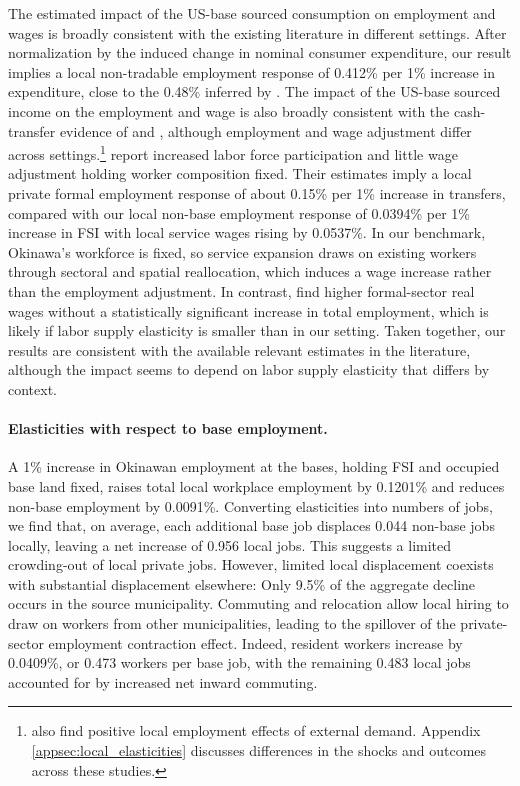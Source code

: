 \documentclass[12pt, unicode, a4paper]{article}
\newcommand{\1}{\mbox{1}\hspace{-0.25em}\mbox{l}} %
\begin{document}
The estimated impact of the US-base sourced consumption on employment and wages is broadly consistent with the existing literature in different settings.
After normalization by the induced change in nominal consumer expenditure, our result implies a local non-tradable employment response of 0.412\% per 1\% increase in expenditure, close to the 0.48\% inferred by \citet{mian2014explains}.
The impact of the US-base sourced income on the employment and wage is also broadly consistent with the cash-transfer evidence of \citet{gerard2026cash} and \citet{mendes2026macroeconomic}, although employment and wage adjustment differ across settings.\footnote{\citet{faber2019tourism} also find positive local employment effects of external demand. Appendix \ref{appsec:local_elasticities} discusses differences in the shocks and outcomes across these studies.} \citet{gerard2026cash} report increased labor force participation and little wage adjustment holding worker composition fixed. Their estimates imply a local private formal employment response of about 0.15\% per 1\% increase in transfers, compared with our local non-base employment response of 0.0394\% per 1\% increase in FSI with local service wages rising by 0.0537\%. In our benchmark, Okinawa's workforce is fixed, so service expansion draws on existing workers through sectoral and spatial reallocation, which induces a wage increase rather than the employment adjustment. In contrast, \citet{mendes2026macroeconomic} find higher formal-sector real wages without a statistically significant increase in total employment, which is likely if labor supply elasticity is smaller than in our setting. 
Taken together, our results are consistent with the available relevant estimates in the literature, although the impact seems to depend on labor supply elasticity that differs by context. 


\paragraph{Elasticities with respect to base employment.}
A 1\% increase in Okinawan employment at the bases, holding FSI and occupied base land fixed, raises total local workplace employment by 0.1201\% and reduces non-base employment by 0.0091\%. Converting elasticities into numbers of jobs, we find that, on average, each additional base job displaces 0.044 non-base jobs locally, leaving a net increase of 0.956 local jobs. 
This suggests a limited crowding-out of local private jobs.
However, limited local displacement coexists with substantial displacement elsewhere: Only 9.5\% of the aggregate decline occurs in the source municipality. Commuting and relocation allow local hiring to draw on workers from other municipalities, leading to the spillover of the private-sector employment contraction effect. Indeed, resident workers increase by 0.0409\%, or 0.473 workers per base job, with the remaining 0.483 local jobs accounted for by increased net inward commuting. 
\end{document}
